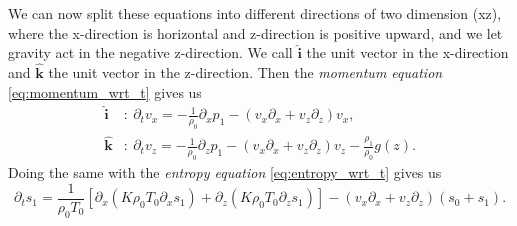 \documentclass{article}
\begin{document}
We can now split these equations into different directions of two dimension (xz), where the x-direction is horizontal and z-direction is positive upward, and we let gravity act in the negative z-direction. We call $\mathbf{\hat{i}}$ the unit vector in the x-direction and $\mathbf{\hat{k}}$ the unit vector in the z-direction. Then the \textit{momentum equation} \ref{eq:momentum_wrt_t} gives us
\begin{align*}
    \mathbf{\hat{i}}&:\ \partial_t v_x = -\frac{1}{\rho_0}\partial_x p_1 - (v_x\partial_x + v_z\partial_z)v_x, \\
    \mathbf{\hat{k}}&:\ \partial_t v_z = -\frac{1}{\rho_0}\partial_z p_1 - (v_x\partial_x + v_z\partial_z)v_z - \frac{\rho_1}{\rho_0}g(z).
\end{align*}
Doing the same with the \textit{entropy equation} \ref{eq:entropy_wrt_t} gives us
\begin{equation*}
    \partial_t s_1 = \frac{1}{\rho_0 T_0}\left[ \partial_x (K\rho_0T_0\partial_xs_1) + \partial_z (K\rho_0T_0\partial_z s_1)\right] - (v_x\partial_x+v_z\partial_z)(s_0+s_1).
\end{equation*}






\end{document}
